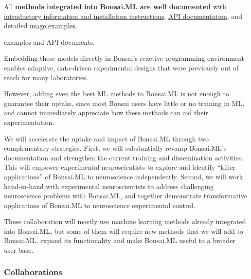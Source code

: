 All \textbf{methods integrated into Bonsai.ML are well documented} with
\href{https://bonsai-rx.org/machinelearning/}{introductory information and
installation instructions},
\href{https://bonsai-rx.org/machinelearning/api/Bonsai.ML.html}{API
documentation}, and detailed
\href{https://bonsai-rx.org/machinelearning/api/Bonsai.ML.html}{usage
examples.}

examples and API documents.

Embedding these models directly in Bonsai's reactive programming
environment enables adaptive, data-driven experimental designs that were
previously out of reach for many laboratories.


However, adding even the best ML methods to Bonsai.ML is not enough to guarantee
their uptake, since most Bonsai users have little or no training in ML, and
cannot immediately appreciate how these methods can aid their experimentation.
%
%

We will accelerate the uptake and impact of Bonsai.ML through two complementary
strategies.
%
First, we will substantially revamp Bonsai.ML's documentation and strengthen
the current training and dissemination activities. This will empower
experimental neuroscientists to explore and identify ``killer applications'' of
Bonsai.ML to neuroscience independently.
%
Second, we will work hand-in-hand with experimental neuroscientists to address
challenging neuroscience problems with Bonsai.ML, and together demonstrate
transformative applications of Bonsai.ML to neuroscience experimental control.

%

These collaboration will mostly use machine learning methods already integrated
into Bonsai.ML, but some of them will require new methods that we will add to
Bonsai.ML, expand its functionality and make Bonsai.ML useful to a broader user
base.

\subsubsection{Collaborations}


